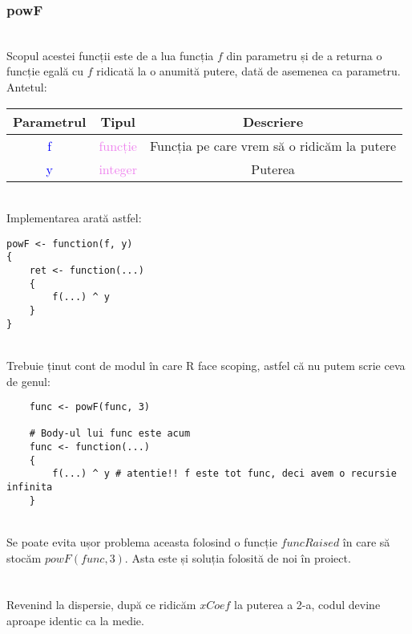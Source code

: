 \documentclass[12pt]{article}
\begin{document}
\subsubsection{powF} \hfill \\
\indent Scopul acestei funcții este de a lua funcția $f$ din parametru și de a returna o funcție egală cu $f$ ridicată la o anumită putere, dată de asemenea ca parametru. Antetul:
\begin{center}
	\begin{tabular}{|| c | c | c ||}
		\hline
		Parametrul & Tipul & Descriere \\
		\hline
		\textcolor{blue}{f} & \textcolor{violet}{funcție} & Funcția pe care vrem să o ridicăm la putere\\
		\hline
		\textcolor{blue}{y} & \textcolor{violet}{integer} & Puterea\\
		\hline
	\end{tabular}
\end{center}\hfill \\
\indent Implementarea arată astfel:
\begin{lstlisting}
powF <- function(f, y)
{
	ret <- function(...)
	{
		f(...) ^ y
	}
}
\end{lstlisting} \hfill \\
\indent Trebuie ținut cont de modul în care R face scoping, astfel că nu putem scrie ceva de genul:
\begin{lstlisting}
	func <- powF(func, 3)
	
	# Body-ul lui func este acum
	func <- function(...)
	{
		f(...) ^ y # atentie!! f este tot func, deci avem o recursie infinita
	}	
\end{lstlisting} \hfill \\
\indent Se poate evita ușor problema aceasta folosind o funcție $funcRaised$ în care să stocăm $powF(func, 3)$. Asta este și soluția folosită de noi în proiect.\\
\noindent\makebox[\linewidth]{\rule{\paperwidth}{0.4pt}}
\\\\
\indent Revenind la dispersie, după ce ridicăm $xCoef$ la puterea a 2-a, codul devine aproape identic ca la medie.\\
\end{document}
